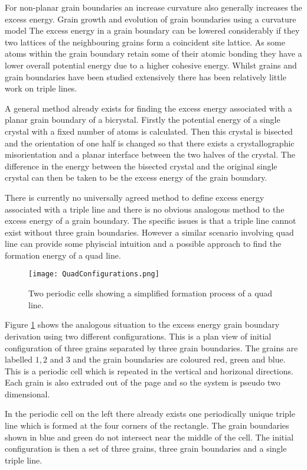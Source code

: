 \documentclass[12pt,a4paper]{book}
\begin{document}
For non-planar grain boundaries an increase curvature also generally increases the excess energy. Grain growth and evolution of grain boundaries using a curvature model  The excess energy in a grain boundary can be lowered considerably if they two lattices of the neighbouring grains form a coincident site lattice. As some atoms within the grain boundary retain some of their atomic bonding they have a lower overall potential energy due to a higher cohesive energy. Whilst grains and grain boundaries have been studied extensively there has been relatively little work on triple lines.

A general method already exists for finding the excess energy associated with a planar grain boundary of a bicrystal. Firstly the potential energy of a single crystal with a fixed number of atoms is calculated. Then this crystal is bisected and the orientation of one half is changed so that there exists a crystallographic misorientation and a planar interface between the two halves of the crystal. The difference in the energy between the bisected crystal and the original single crystal can then be taken to be the excess energy of the grain boundary.

There is currently no universally agreed method to define excess energy associated with a triple line and there is no obvious analogous method to the excess energy of a grain boundary. The specific issues is that a triple line cannot exist without three grain boundaries. However a similar scenario involving quad line can provide some phyiscial intuition and a possible approach to find the formation energy of a quad line. 

\begin{figure}[H]
	\centering
	\texttt{[image: QuadConfigurations.png]} 
\label{fig:1}
\caption{Two periodic cells showing a simplified formation process of a quad line.}
\end{figure}

Figure \ref{fig:1}
 shows the analogous situation to the excess energy grain boundary derivation using two different configurations. This is a plan view of initial configuration of three grains separated by three grain boundaries. The grains are labelled $1, 2$ and $3$ and the grain boundaries are coloured red, green and blue. This is a periodic cell which is repeated in the vertical and horizonal directions. Each grain is also extruded out of the page and so the system is pseudo two dimensional.
 
In the periodic cell on the left there already exists one periodically unique triple line which is formed at the four corners of the rectangle. The grain boundaries shown in blue and green do not intersect near the middle of the cell. The initial configuration is then a set of three grains, three grain boundaries and a single triple line.
\end{document}
